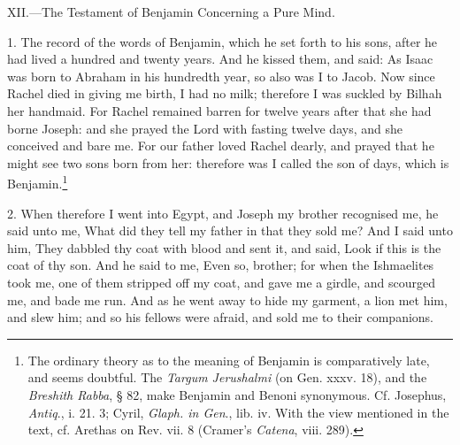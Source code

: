 XII.—The Testament of Benjamin Concerning a Pure Mind.

1. The record of the words of Benjamin, which he set forth to his sons, after he had lived a hundred and twenty years. And he kissed them, and said: As Isaac was born to Abraham in his hundredth year, so also was I to Jacob. Now since Rachel died in giving me birth, I had no milk; therefore I was suckled by Bilhah her handmaid. For Rachel remained barren for twelve years after that she had borne Joseph: and she prayed the Lord with fasting twelve days, and she conceived and bare me. For our father loved Rachel dearly, and prayed that he might see two sons born from her: therefore was I called the son of days, which is Benjamin.\footnote{The ordinary theory as to the meaning of Benjamin is comparatively late, and seems doubtful. The \emph{Targum Jerushalmi} (on Gen. xxxv. 18), and the \emph{Breshith Rabba}, § 82, make Benjamin and Benoni synonymous. Cf. Josephus, \emph{Antiq}., i. 21. 3; Cyril, \emph{Glaph. in Gen}., lib. iv. With the view mentioned in the text, cf. Arethas on Rev. vii. 8 (Cramer’s \emph{Catena}, viii. 289).}

2. When therefore I went into Egypt, and Joseph my brother recognised me, he said unto me, What did they tell my father in that they sold me? And I said unto him, They dabbled thy coat with blood and sent it, and said, Look if this is the coat of thy son. And he said to me, Even so, brother; for when the Ishmaelites took me, one of them stripped off my coat, and gave me a girdle, and scourged me, and bade me run. And as he went away to hide my garment, a lion met him, and slew him; and so his fellows were afraid, and sold me to their companions.

